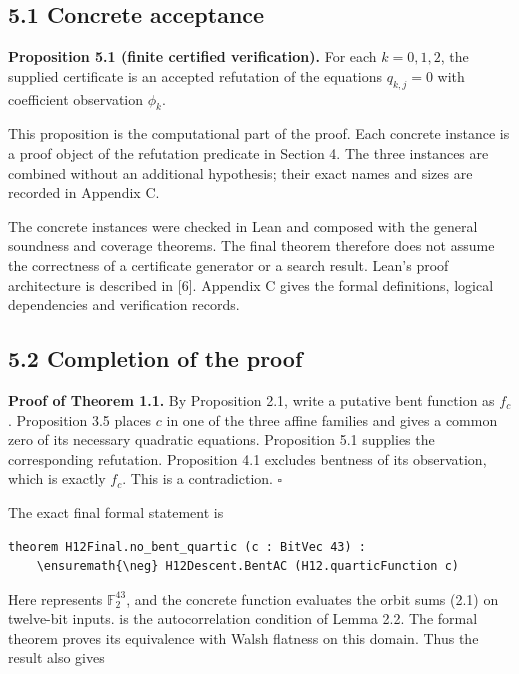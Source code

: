 \documentclass[pdflatex,sn-mathphys-num]{sn-jnl}
\begin{document}
\subsection*{5.1 Concrete acceptance}

\textbf{Proposition 5.1 (finite certified verification).} For each $k=0,1,2$, the supplied certificate is an accepted refutation of the equations $q_{k,j}=0$ with coefficient observation $\phi_k$.

This proposition is the computational part of the proof. Each concrete instance is a proof object of the refutation predicate in Section 4. The three instances are combined without an additional hypothesis; their exact names and sizes are recorded in Appendix C.

The concrete instances were checked in Lean and composed with the general soundness and coverage theorems. The final theorem therefore does not assume the correctness of a certificate generator or a search result. Lean's proof architecture is described in [6]. Appendix C gives the formal definitions, logical dependencies and verification records.

\subsection*{5.2 Completion of the proof}

\textbf{Proof of Theorem 1.1.} By Proposition 2.1, write a putative bent function as $f_c$. Proposition 3.5 places $c$ in one of the three affine families and gives a common zero of its necessary quadratic equations. Proposition 5.1 supplies the corresponding refutation. Proposition 4.1 excludes bentness of its observation, which is exactly $f_c$. This is a contradiction. \hfill$\square$

The exact final formal statement is

\begin{Verbatim}[fontsize=\scriptsize,breaklines=true,breakanywhere=true,commandchars=\\\{\}]
theorem H12Final.no_bent_quartic (c : BitVec 43) :
    \ensuremath{\neg} H12Descent.BentAC (H12.quarticFunction c)
\end{Verbatim}

Here  represents $\mathbb F_2^{43}$, and the concrete function evaluates the orbit sums (2.1) on twelve-bit inputs.  is the autocorrelation condition of Lemma 2.2. The formal theorem  proves its equivalence with Walsh flatness on this domain. Thus the result also gives
\end{document}

